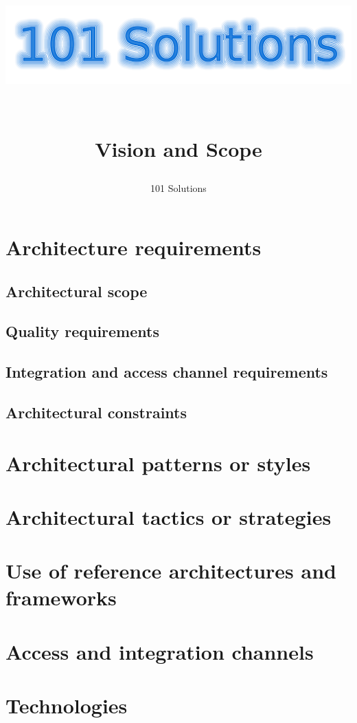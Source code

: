 \documentclass[a4paper,12pt,final]{article}
\title{
\begin{center}
  	\includegraphics[scale=0.3]{101Logo.png} 
  \end{center}
  \textbf{\\}
Vision and Scope\\
}
\author{101 Solutions}
\begin{document}
\maketitle
\thispagestyle{empty}
\newpage
\tableofcontents
\thispagestyle{empty}
\newpage
{}
\section{Architecture requirements}
\subsection{Architectural scope}
\subsection{Quality requirements}
\subsection{Integration and access channel requirements}
\subsection{Architectural constraints}
\section{Architectural patterns or styles}
\section{Architectural tactics or strategies}
\section{Use of reference architectures and\\ frameworks}
\section{Access and integration channels}
\section{Technologies}
\end{document}
